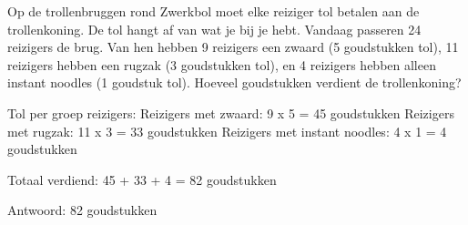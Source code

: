 \begin{opgave}
Op de trollenbruggen rond Zwerkbol moet elke reiziger tol betalen aan de 
trollenkoning. De tol hangt af van wat je bij je hebt. Vandaag passeren 24 
reizigers de brug. Van hen hebben 9 reizigers een zwaard (5 goudstukken tol), 
11 reizigers hebben een rugzak (3 goudstukken tol), en 4 reizigers hebben 
alleen instant noodles (1 goudstuk tol). Hoeveel goudstukken verdient de 
trollenkoning?
\end{opgave}

\begin{oplossing}
Tol per groep reizigers:
Reizigers met zwaard: 9 x 5 = 45 goudstukken
Reizigers met rugzak: 11 x 3 = 33 goudstukken
Reizigers met instant noodles: 4 x 1 = 4 goudstukken

Totaal verdiend:
45 + 33 + 4 = 82 goudstukken

Antwoord: 82 goudstukken
\end{oplossing}